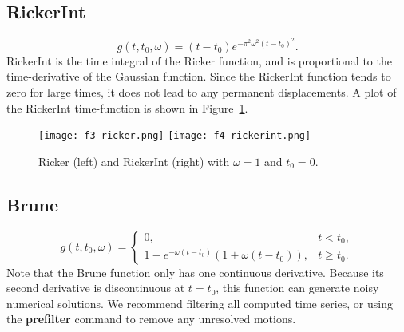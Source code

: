 \documentclass[11pt]{report}
\begin{document}
\subsection{RickerInt}\label{rickerint}
  \[
  g(t,t_0,\omega) = (t - t_0) e^{- \pi^2 \omega^2 (t - t_0)^2}.
  \]
RickerInt is the time integral of the Ricker function, and is proportional to the time-derivative of
the Gaussian function. Since the RickerInt function tends to zero for large times, it does not lead
to any permanent displacements. A plot of the RickerInt time-function is shown in
Figure~\ref{fig:rickers}.
\begin{figure}
\begin{centering}
  \texttt{[image: f3-ricker.png]}
  \texttt{[image: f4-rickerint.png]}
  \caption{Ricker (left) and RickerInt (right) with $\omega=1$ and $t_0=0$.}
  \label{fig:rickers}
\end{centering}
\end{figure}  
%
\subsection{Brune} 
 \label{brune}
\[
 g(t,t_0,\omega) = \left\{
\begin{array}{ll} 
0, & t < t_0, \\ 
1 - e^{-\omega(t-t_0)}( 1+\omega(t-t_0) ), & t \geq t_0.
\end{array}
\right.
\]
Note that the Brune function only has one continuous derivative. Because its second derivative is discontinuous at
$t=t_0$, this function can generate noisy numerical solutions. We recommend filtering all computed time
series, or using the {\bf prefilter} command to remove any unresolved motions.
\end{document}
